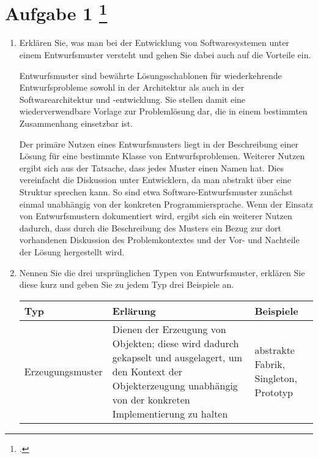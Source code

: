 \documentclass{lehramt-informatik-aufgabe}
\begin{document}

\section{Aufgabe 1
\footcite{sosy:ab:6}}

\begin{enumerate}


\item Erklären Sie, was man bei der Entwicklung von Softwaresystemen
unter einem Entwurfsmuster versteht und gehen Sie dabei auch auf die
Vorteile ein.

\begin{antwort}
Entwurfsmuster sind bewährte Lösungsschablonen für wiederkehrende
Entwurfsprobleme sowohl in der Architektur als auch in der
Softwarearchitektur und -entwicklung. Sie stellen damit eine
wiederverwendbare Vorlage zur Problemlösung dar, die in einem bestimmten
Zusammenhang einsetzbar ist.

Der primäre Nutzen eines Entwurfsmusters liegt in der Beschreibung einer
Lösung für eine bestimmte Klasse von Entwurfsproblemen. Weiterer Nutzen
ergibt sich aus der Tatsache, dass jedes Muster einen Namen hat. Dies
vereinfacht die Diskussion unter Entwicklern, da man abstrakt über eine
Struktur sprechen kann. So sind etwa Software-Entwurfsmuster zunächst
einmal unabhängig von der konkreten Programmiersprache. Wenn der Einsatz
von Entwurfsmustern dokumentiert wird, ergibt sich ein weiterer Nutzen
dadurch, dass durch die Beschreibung des Musters ein Bezug zur dort
vorhandenen Diskussion des Problemkontextes und der Vor- und Nachteile
der Lösung hergestellt wird.
\end{antwort}


\item Nennen Sie die drei ursprünglichen Typen von Entwurfsmuster,
erklären Sie diese kurz und geben Sie zu jedem Typ drei Beispiele an.

\begin{antwort}

\begin{tabularx}{\linewidth}{p{2cm}|X|p{2cm}}
\textbf{Typ} & \textbf{Erlärung} & \textbf{Beispiele} \\\hline\hline

Erzeugungsmuster &
Dienen der Erzeugung von Objekten; diese wird dadurch gekapselt und
ausgelagert, um den Kontext der Objekterzeugung unabhängig von der
konkreten Implementierung zu halten &
abstrakte Fabrik, Singleton, Prototyp \\\hline


\end{tabularx}
\end{antwort}
\end{enumerate}
\end{document}
